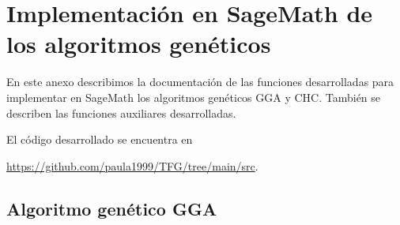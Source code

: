 \newpage
\null
\thispagestyle{empty}

\chapter[Implementación en SageMath de los algoritmos genéticos]{Implementación en SageMath de los algoritmos genéticos}
\label{annex:sage-geneticos}

En este anexo describimos la documentación de las funciones desarrolladas para implementar en SageMath los algoritmos genéticos GGA y CHC. También se describen las funciones auxiliares desarrolladas. 

El código desarrollado se encuentra en
\begin{center}
\url{https://github.com/paula1999/TFG/tree/main/src}.
\end{center}

\section{Algoritmo genético GGA}

